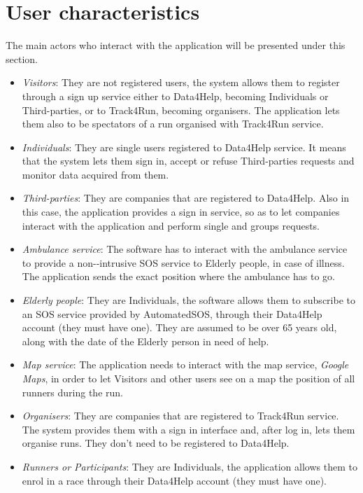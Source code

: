 \section{User characteristics}

The main actors who interact with the application will be presented under this section. 

\begin{itemize}
    \item \emph{Visitors}: They are not registered users, the system allows them to register through a sign up service either to Data4Help, becoming Individuals or Third-parties, or to Track4Run, becoming organisers. The application lets them also to be spectators of a run organised with Track4Run service. 
    \item \emph{Individuals}: They are single users registered to Data4Help service. It means that the system lets them sign in, accept or refuse Third-parties requests and monitor data acquired from them.
    \item \emph{Third-parties}: They are companies that are registered to Data4Help. Also in this case, the application provides a sign in service, so as to let companies interact with the application and perform single and groups requests. 
    \item \emph{Ambulance service}: The software has to interact with the ambulance service  to provide a non-‐intrusive SOS service to Elderly people, in case of illness. The application sends the exact position where the ambulance has to go.  
    \item \emph{Elderly people}: They are Individuals, the software allows them to subscribe to an SOS service provided by AutomatedSOS, through their Data4Help account (they must have one). They are assumed to be over 65 years old, along with the date of the Elderly person in need of help.
    \item \emph{Map service}: The application needs to interact with the map service, \emph{Google Maps}, in order to let Visitors and other users see on a map the position of all runners during the run.
    \item \emph{Organisers}: They are companies that are registered to Track4Run service. The system provides them with a sign in interface and, after log in, lets them organise runs. They don't need to be registered to Data4Help.
    \item \emph{Runners or Participants}: They are Individuals, the application allows them to enrol in a race through their Data4Help account (they must have one).
\end{itemize}